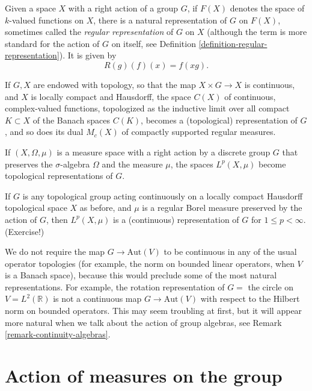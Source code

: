 \begin{example}
 \label{example-representation}
Given a space $X$ with a right action of a group $G$, if $F(X)$ denotes the space of $k$-valued functions on $X$, there is a natural representation of $G$ on $F(X)$, sometimes called the \emph{regular representation} of $G$ on $X$ (although the term is more standard for the action of $G$ on itself, see Definition \ref{definition-regular-representation}). It is given by 
$$ R(g)(f)(x) = f(xg).$$

If $G, X$ are endowed with topology, so that the map $X\times G\to X$ is continuous, and $X$ is locally compact and Hausdorff, the space $C(X)$ of continuous, complex-valued functions, topologized as the inductive limit over all compact $K\subset X$ of the Banach spaces $C(K)$, becomes a (topological) representation of $G$, and so does its dual $M_c(X)$ of compactly supported regular measures.

If $(X,\Omega, \mu)$ is a measure space with a right action by a discrete group $G$ that preserves the $\sigma$-algebra $\Omega$ and the measure $\mu$, the spaces $L^p(X,\mu)$ become topological representations of $G$. 

If $G$ is any topological group acting continuously on a locally compact Hausdorff topological space $X$ as before, and $\mu$ is a regular Borel measure preserved by the action of $G$, then $L^p(X,\mu)$ is a (continuous) representation of $G$ for $1\le p<\infty$. (Exercise!)        
\end{example}



\begin{remark}
\label{remark-continuity-operatortopology}
 We do not require the map $G\to \text{Aut}(V)$ to be continuous in any of the usual operator topologies (for example, the norm on bounded linear operators, when $V$ is a Banach space), because this would preclude some of the most natural representations. For example, the rotation representation of $G=$ the circle on $V=L^2(\mathbb R)$ is not a continuous map $G\to \text{Aut}(V)$ with respect to the Hilbert norm on bounded operators. This may seem troubling at first, but it will appear more natural when we talk about the action of group algebras, see Remark \ref{remark-continuity-algebras}.
\end{remark}




\section{Action of measures on the group}
\label{section-measures}


